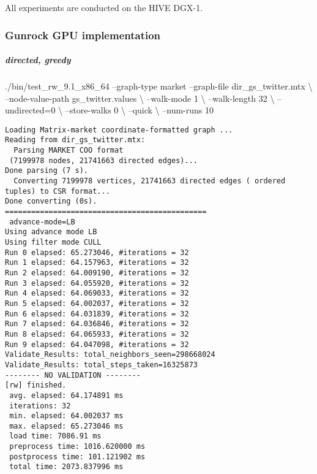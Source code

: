 \documentclass[10pt,oneside]{memoir}
\newenvironment{Shaded}{}{}
\newcommand{\ExtensionTok}[1]{#1}
\newcommand{\NormalTok}[1]{#1}
\let\oldsubparagraph\subparagraph
\renewcommand{\subparagraph}[1]{\oldsubparagraph{#1}\mbox{}}
\begin{document}
All experiments are conducted on the HIVE DGX-1.

\hypertarget{gunrock-gpu-implementation}{%
\subsubsection{Gunrock GPU
implementation}\label{gunrock-gpu-implementation}}

\hypertarget{directed-greedy}{%
\subparagraph{directed, greedy}\label{directed-greedy}}

\begin{Shaded}
\begin{Highlighting}[]
\ExtensionTok{./bin/test_rw_9.1_x86_64}\NormalTok{ --graph-type market --graph-file dir_gs_twitter.mtx \textbackslash{}}
\NormalTok{    --node-value-path gs_twitter.values \textbackslash{}}
\NormalTok{    --walk-mode 1 \textbackslash{}}
\NormalTok{    --walk-length 32 \textbackslash{}}
\NormalTok{    --undirected=0 \textbackslash{}}
\NormalTok{    --store-walks 0 \textbackslash{}}
\NormalTok{    --quick \textbackslash{}}
\NormalTok{    --num-runs 10}
\end{Highlighting}
\end{Shaded}

\begin{verbatim}
Loading Matrix-market coordinate-formatted graph ...
Reading from dir_gs_twitter.mtx:
  Parsing MARKET COO format
 (7199978 nodes, 21741663 directed edges)...
Done parsing (7 s).
  Converting 7199978 vertices, 21741663 directed edges ( ordered tuples) to CSR format...
Done converting (0s).
==============================================
 advance-mode=LB
Using advance mode LB
Using filter mode CULL
Run 0 elapsed: 65.273046, #iterations = 32
Run 1 elapsed: 64.157963, #iterations = 32
Run 2 elapsed: 64.009190, #iterations = 32
Run 3 elapsed: 64.055920, #iterations = 32
Run 4 elapsed: 64.069033, #iterations = 32
Run 5 elapsed: 64.002037, #iterations = 32
Run 6 elapsed: 64.031839, #iterations = 32
Run 7 elapsed: 64.036846, #iterations = 32
Run 8 elapsed: 64.065933, #iterations = 32
Run 9 elapsed: 64.047098, #iterations = 32
Validate_Results: total_neighbors_seen=298668024
Validate_Results: total_steps_taken=16325873
-------- NO VALIDATION --------
[rw] finished.
 avg. elapsed: 64.174891 ms
 iterations: 32
 min. elapsed: 64.002037 ms
 max. elapsed: 65.273046 ms
 load time: 7086.91 ms
 preprocess time: 1016.620000 ms
 postprocess time: 101.121902 ms
 total time: 2073.837996 ms
\end{verbatim}
\end{document}
